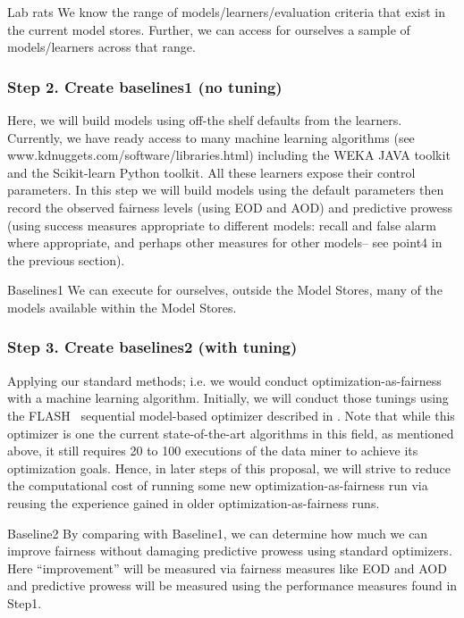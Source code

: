      
    
\begin{success}{Lab rats}
We know the range of models/learners/evaluation criteria
that exist in the current model stores. Further, we can access
for ourselves a sample of models/learners across that range.
\end{success}

 
\subsubsection{Step 2. Create baselines1 (no tuning)} Here, we will build models using off-the shelf defaults from the learners. 
Currently, we have ready access
to many   machine learning algorithms (see  www.kdnuggets.com/software/libraries.html) including the WEKA JAVA toolkit
and the Scikit-learn Python toolkit. All these learners expose their control parameters.
In this step we will build models using the default parameters then record the observed fairness levels (using EOD and AOD) and predictive prowess
(using success measures appropriate to different models: recall and false alarm where appropriate, and perhaps other measures for other models-- see point4 in the previous section).  


\begin{success}{Baselines1}
We can   execute
for ourselves, outside the Model Stores, many of the
  models available within the Model Stores. 
\end{success}

\subsubsection{Step 3. Create baselines2 (with tuning)} Applying
our standard methods; i.e.
we would conduct optimization-as-fairness
with a machine learning algorithm.  Initially, we will 
conduct those tunings using the FLASH~\cite{nair2017flash} sequential model-based
optimizer described in  . Note that while this
optimizer is one the current state-of-the-art algorithms in this field,
as mentioned above, it still requires 20 to 100 executions
of the data miner to achieve its optimization goals. Hence,
in later steps of this proposal, we will strive to reduce the
computational cost of running some new optimization-as-fairness
run via reusing the experience gained in older 
optimization-as-fairness
runs.


\begin{success}{Baseline2}
By comparing with Baseline1,
we can determine how much we can improve fairness without damaging predictive prowess using standard optimizers. Here ``improvement'' will be measured
via fairness measures like EOD and AOD and predictive prowess will be measured
using the performance measures found in Step1.
\end{success}


